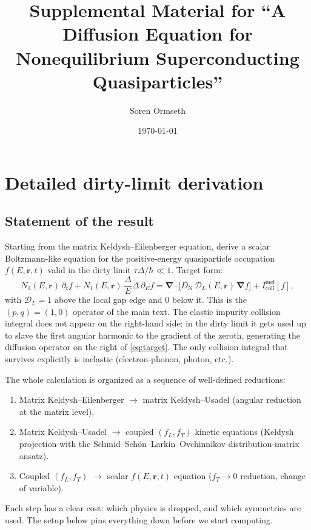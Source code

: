 \documentclass[
  aps,
  prb,
  preprint,
  superscriptaddress,
  longbibliography,
  nofootinbib
]{revtex4-2}
\newcommand{\br}{\mathbf{r}}
\newcommand{\bnabla}{\boldsymbol{\nabla}}
\newcommand{\DOS}{N_1}
\newcommand{\DN}{D_{\mathrm{N}}}
\newcommand{\Icoll}{I_{\mathrm{coll}}}
\newcommand{\fL}{f_L}
\newcommand{\fT}{f_T}
\begin{document}
\title{Supplemental Material for ``A Diffusion Equation for Nonequilibrium Superconducting Quasiparticles''}

\author{Soren Ormseth}

\date{\today}

\maketitle

\section{Detailed dirty-limit derivation}\label{app:derivation}


\subsection*{Statement of the result}

Starting from the matrix Keldysh--Eilenberger equation, derive a scalar
Boltzmann-like equation for the positive-energy quasiparticle occupation
\(f(E,\br,t)\) valid in the dirty limit \(\tau\Delta/\hbar\ll 1\). Target form:
\begin{equation}
  \DOS(E,\br)\,\partial_t f
  + \DOS(E,\br)\,\frac{\Delta}{E}\dot{\Delta}\,\partial_E f
  =
  \bnabla\!\cdot\!\bigl[\DN\,\mathcal D_L(E,\br)\,\bnabla f\bigr]
  + \Icoll^{\mathrm{inel}}[f],
  \label{eq:target}
\end{equation}
with \(\mathcal D_L=1\) above the local gap edge and \(0\) below it.
This is the \((p,q)=(1,0)\) operator of the main text. The elastic impurity
collision integral does not appear on the right-hand side: in the dirty limit it
gets used up to slave the first angular harmonic to the gradient of the zeroth,
generating the diffusion operator on the right of \cref{eq:target}. The only
collision integral that survives explicitly is inelastic
(electron-phonon, photon, etc.).

The whole calculation is organized as a sequence of well-defined reductions:
\begin{enumerate}
  \item Matrix Keldysh--Eilenberger \(\to\) matrix Keldysh--Usadel
        (angular reduction at the matrix level).
  \item Matrix Keldysh--Usadel \(\to\) coupled \((\fL,\fT)\) kinetic equations
        (Keldysh projection with the Schmid--Sch\"on--Larkin--Ovchinnikov
        distribution-matrix ansatz).
  \item Coupled \((\fL,\fT)\) \(\to\) scalar \(f(E,\br,t)\) equation
        (\(\fT\!\to\!0\) reduction, change of variable).
\end{enumerate}
Each step has a clear cost: which physics is dropped, and which symmetries are
used. The setup below pins everything down before we start computing.
\end{document}
